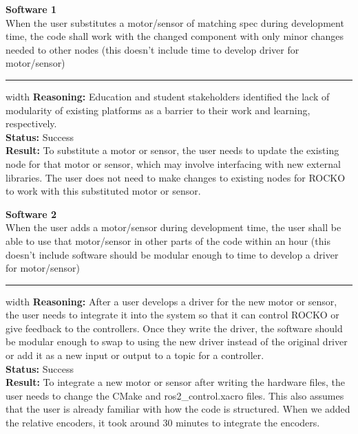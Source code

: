 \documentclass{fank1basedocument}
\begin{document}
{\large \textbf{Software 1}}\\
When the user substitutes a motor/sensor of matching spec during development time, the code shall work with the changed component with only minor changes needed to other nodes (this doesn’t include time to develop driver for motor/sensor)
\hrule width \linewidth
\vspace{2px}
\textbf{Reasoning:} Education and student stakeholders identified the lack of modularity of existing platforms as a barrier to their work and learning, respectively.\\
\textbf{Status:} \color{ForestGreen}Success\color{black}\\
\textbf{Result:} To substitute a motor or sensor, the user needs to update the existing node for that motor or sensor, which may involve interfacing with new external libraries. The user does not need to make changes to existing nodes for ROCKO to work with this substituted motor or sensor.\\

\pagebreak

{\large \textbf{Software 2}}\\
When the user adds a motor/sensor during development time, the user shall be able to use that motor/sensor in other parts of the code within an hour (this doesn’t include software should be modular enough to time to develop a driver for motor/sensor)
\hrule width \linewidth
\vspace{2px}
\textbf{Reasoning:} After a user develops a driver for the new motor or sensor, the user needs to integrate it into the system so that it can control ROCKO or give feedback to the controllers. Once they write the driver, the software should be modular enough to swap to using the new driver instead of the original driver or add it as a new input or output to a topic for a controller.\\
\textbf{Status:} \color{ForestGreen}Success\color{black}\\
\textbf{Result:} To integrate a new motor or sensor after writing the hardware files, the user needs to change the CMake and ros2\_control.xacro files. This also assumes that the user is already familiar with how the code is structured. When we added the relative encoders, it took around 30 minutes to integrate the encoders.\\
\end{document}
